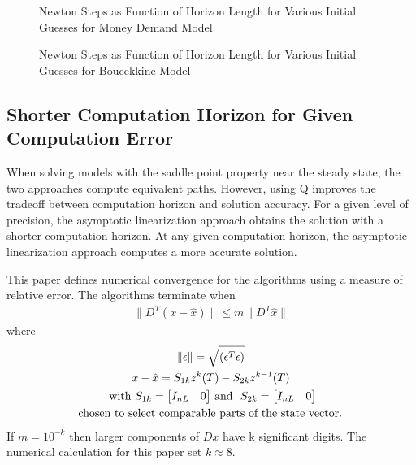 \documentclass[12pt]{article}
\begin{document}
\begin{figure}[htbp]
  \begin{center}
    \leavevmode
\fbox{
}    \caption{Newton Steps as Function of Horizon Length for Various Initial Guesses for Money Demand Model}
  \label{fig:newtQMon}
  \fbox{
}    \caption{Newton Steps as Function of Horizon Length for Various Initial Guesses for Boucekkine Model}
  \label{fig:newtQBou}
  \end{center}
\end{figure}



\subsection{Shorter Computation Horizon for Given Computation Error}
\label{sec:shorter}

When solving models with the saddle point property
near the steady state,
the two approaches compute equivalent paths.
However, using Q
improves the tradeoff between computation horizon and solution accuracy.
For a given level of precision,
the asymptotic linearization approach obtains the solution
 with a shorter computation horizon.
At any given computation horizon, the asymptotic linearization approach
computes a more accurate solution.


This paper defines  numerical 
convergence for the algorithms
using a measure of relative error.
The algorithms terminate when
\begin{gather*}
  \| D^T (x - \hat{x})\| \le m \| D^T  \hat{x} \|
\end{gather*}
where 
%
%
\begin{gather*}
  \| \epsilon \| = \sqrt{ (\epsilon^T \epsilon)}\\
x-\hat{x} = S_{1k} z^k(T) - S_{2k} z^{k-1}(T)\\
\text{ with 
$ S_{1k} = 
  \begin{bmatrix}
    I_{nL}&0
  \end{bmatrix}
$ and 
$\  S_{2k} = 
  \begin{bmatrix}
    I_{nL}&0
  \end{bmatrix}
$}\\
\text{  chosen to select comparable parts of the state vector. }
\end{gather*}
If $m= 10^{-k}$ then larger components of $D x$ have k significant digits\cite{NAG}. 
The numerical calculation for this paper set $k \approx 8$.
\end{document}
